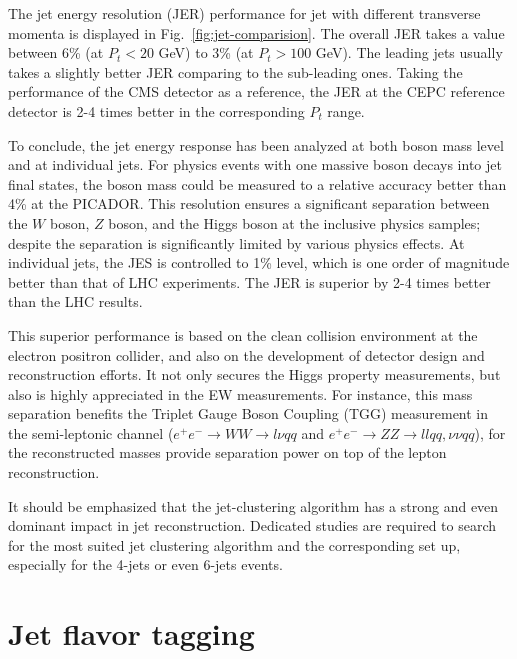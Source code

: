 The jet energy resolution (JER) performance for jet with different transverse momenta is displayed in Fig.~\ref{fig:jet-comparision}.
The overall JER takes a value between 6\% (at $P_t < 20$ GeV) to 3\% (at $P_t > 100$ GeV).
The leading jets usually takes a slightly better JER comparing to the sub-leading ones.
Taking the performance of the CMS detector as a reference,
the JER at the CEPC reference detector is 2-4 times better in the corresponding $P_t$ range. 

To conclude, the jet energy response has been analyzed at both boson mass level and at individual jets.
For physics events with one massive boson decays into jet final states,
the boson mass could be measured to a relative accuracy better than 4\% at the PICADOR.
This resolution ensures a significant separation between the $W$ boson, $Z$ boson,
and the Higgs boson at the inclusive physics samples;
despite the separation is significantly limited by various physics effects.
At individual jets, the JES is controlled to 1\% level, which is one order of magnitude better than that of LHC experiments.
The JER is superior by 2-4 times better than the LHC results. 

This superior performance is based on the clean collision environment at the electron positron collider,
and also on the development of detector design and reconstruction efforts.
It not only secures the Higgs property measurements, but also is highly appreciated in the EW measurements.
For instance, this mass separation benefits the Triplet Gauge Boson Coupling (TGG) measurement
in the semi-leptonic channel ($e^+e^- \to WW\to l\nu qq$ and $e^+e^-\to ZZ\to llqq, \nu\nu qq$),
for the reconstructed masses provide separation power on top of the lepton reconstruction.

It should be emphasized that the jet-clustering algorithm has a strong and even dominant impact
in jet reconstruction. Dedicated studies are required to search for the most suited jet clustering algorithm
and the corresponding set up, especially for the 4-jets or even 6-jets events. 


\section{Jet flavor tagging}

